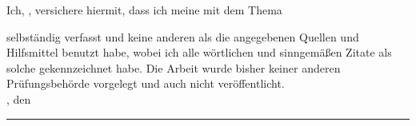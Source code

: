 
Ich, \autor, versichere hiermit, dass ich meine \textbf{\betreff} mit dem Thema
\begin{quote}
    \textit{\kompletterTitel}
\end{quote}
selbständig verfasst und keine anderen als die angegebenen Quellen und Hilfsmittel benutzt habe,
wobei ich alle wörtlichen und sinngemäßen Zitate als solche gekennzeichnet habe. Die Arbeit
wurde bisher keiner anderen Prüfungsbehörde vorgelegt und auch nicht veröffentlicht.\\[6ex]

\ort, den \abgabetermin


\rule[-0.2cm]{5.5cm}{0.5pt}

\textsc{\autor} 
